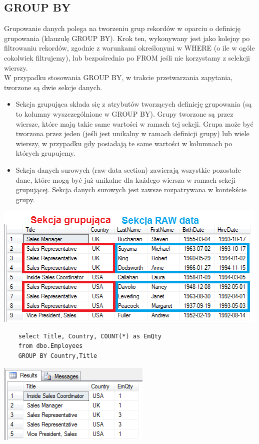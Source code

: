 \documentclass[12pt]{article}
\begin{document}
    \subsection{GROUP BY}
    Grupowanie danych polega na tworzeniu grup rekordów w oparciu o definicję grupowania (klauzulę GROUP BY). Krok ten, wykonywany jest jako kolejny po filtrowaniu rekordów, zgodnie z warunkami określonymi w WHERE (o ile w ogóle cokolwiek filtrujemy), lub bezpośrednio po FROM jeśli nie korzystamy z selekcji wierszy.
    \\
    W przypadku stosowania GROUP BY, w trakcie przetwarzania zapytania, tworzone są dwie sekcje danych.
    \begin{itemize}
        \item Sekcja grupująca składa się z atrybutów tworzących definicję grupowania (są to kolumny wyszczególnione w GROUP BY). Grupy tworzone są przez wiersze, które mają takie same wartości w ramach tej sekcji. Grupa może być tworzona przez jeden (jeśli jest unikalny w ramach definicji grupy) lub wiele wierszy, w przypadku gdy posiadają te same wartości w kolumnach po których grupujemy.
        \item Sekcja danych surowych (raw data section) zawierają wszystkie pozostałe dane, które mogą być już unikalne dla każdego wiersza w ramach sekcji grupującej. Sekcja danych surowych jest zawsze rozpatrywana w kontekście grupy.
    \end{itemize}
    \begin{center}
            \includegraphics[scale=1]{graphics/sql/before-group-by.png}
    \end{center}
    \begin{verbatim}
    select Title, Country, COUNT(*) as EmQty
    from dbo.Employees
    GROUP BY Country,Title
    \end{verbatim}
    \begin{center}
            \includegraphics[scale=1]{graphics/sql/after-group-by.png}
    \end{center}
    
\end{document}
